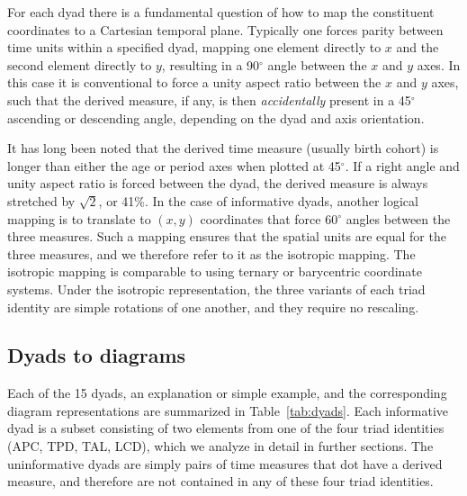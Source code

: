 \documentclass[12pt,oneside,a4paper]{article} %
\begin{document}
For each dyad there is a fundamental question of how to map the constituent
coordinates to a Cartesian temporal plane. Typically one forces parity between time units within
a specified dyad, mapping one element directly to $x$ and the second element
directly to $y$, resulting in a 90$^\circ$ angle between the $x$ and $y$
axes. In this case it is conventional to force a unity aspect ratio
between the $x$ and $y$ axes, such that the derived measure, if any, is then
\textit{accidentally} present in a 45$^\circ$ ascending or descending angle,
depending on the dyad and axis orientation. 

It has long been noted \citep{perozzo1880della, zeuner1869abhandlungen} that the
derived time measure (usually birth cohort) is longer than either the age or period axes when plotted at 45$^\circ$.
If a right angle and unity aspect ratio is forced between the dyad, the derived measure is always stretched by
$\sqrt{2}$, or 41\%. In the case of informative dyads, another
logical mapping is to translate to $(x,y)$ coordinates that force 60$^\circ$
angles between the three measures. Such a mapping ensures that the spatial units are equal for the three measures, and we therefore refer to it as the isotropic mapping. The isotropic mapping
is comparable to using ternary or barycentric coordinate systems. 
Under the isotropic representation, the three variants of each triad identity
are simple rotations of one another, and they require no rescaling.

\subsection{Dyads to diagrams}
Each of the 15 dyads, an explanation or simple example,
and the corresponding diagram representations are summarized in
Table~\ref{tab:dyads}. Each informative dyad is a subset consisting of two
elements from one of the four triad identities (APC, TPD, TAL, LCD), which we
analyze in detail in further sections. The uninformative dyads are simply pairs of time measures that dot have a derived measure, and therefore are not contained in any of these four triad identities.
\pagebreak
\end{document}
